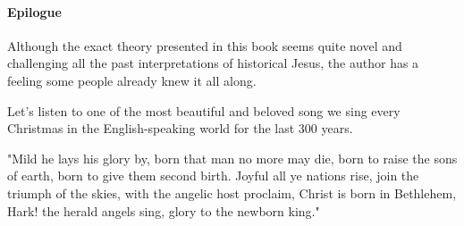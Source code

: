 \paragraph{Epilogue}\label{par:epilogue}

Although the exact theory presented in this book seems quite novel and challenging all the past interpretations of historical Jesus, the author has a feeling some people already knew it all along.

Let's listen to one of the most beautiful and beloved song we sing every Christmas in the English-speaking world for the last 300 years.

"Mild he lays his glory by, born that man no more may die, born to raise the sons of earth, born to give them second birth.
Joyful all ye nations rise, join the triumph of the skies, with the angelic host proclaim, Christ is born in Bethlehem, Hark!
the herald angels sing, glory to the newborn king."
